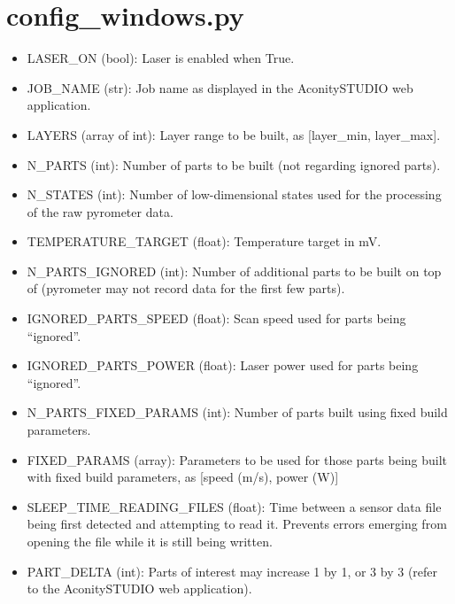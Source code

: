 \documentclass[letterpaper,10pt,english,openany,oneside]{sphinxmanual}
\begin{document}
\section{config\_windows.py}
\label{\detokenize{config:config-windows-py}}\begin{itemize}
\item {} 
LASER\_ON (bool): Laser is enabled when True.

\item {} 
JOB\_NAME (str): Job name as displayed in the AconitySTUDIO web application.

\item {} 
LAYERS (array of int): Layer range to be built, as {[}layer\_min, layer\_max{]}.

\item {} 
N\_PARTS (int): Number of parts to be built (not regarding ignored parts).

\item {} 
N\_STATES (int): Number of low-dimensional states used for the processing of the raw pyrometer data.

\item {} 
TEMPERATURE\_TARGET (float): Temperature target in mV.

\item {} 
N\_PARTS\_IGNORED (int): Number of additional parts to be built on top of  (pyrometer may not record data for the first few parts).

\item {} 
IGNORED\_PARTS\_SPEED (float): Scan speed used for parts being “ignored”.

\item {} 
IGNORED\_PARTS\_POWER (float): Laser power used for parts being “ignored”.

\item {} 
N\_PARTS\_FIXED\_PARAMS (int): Number of parts built using fixed build parameters.

\item {} 
FIXED\_PARAMS (array): Parameters to be used for those parts being built with fixed build parameters, as {[}speed (m/s), power (W){]}

\item {} 
SLEEP\_TIME\_READING\_FILES (float): Time between a sensor data file being first detected and attempting to read it. Prevents errors emerging from opening the file while it is still being written.

\item {} 
PART\_DELTA (int): Parts of interest may increase 1 by 1, or 3 by 3 (refer to the AconitySTUDIO web application).

\end{itemize}
\end{document}
